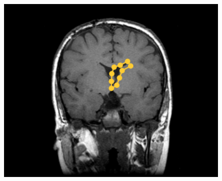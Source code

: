 \documentclass[final]{beamer}
\newlength{\onecolwid}
\begin{document}
\begin{frame}[t]
\begin{columns}[t]
\begin{column}{\onecolwid}
\begin{block}{ }
\begin{figure}
\includegraphics[width=.9\linewidth]{screen4.png}
\end{figure}


\end{block}
\end{column}
\end{columns}
\end{frame}
\end{document}
